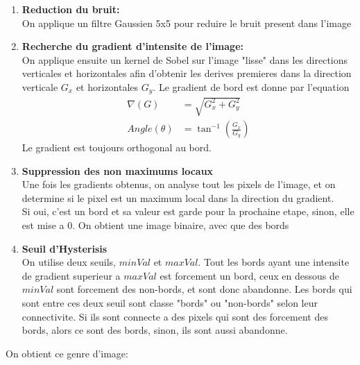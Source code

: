 \documentclass[a4paper, 12pt, titlepage, oneside]{article}
\begin{document}
	\begin{enumerate}
		\item \textbf{Reduction du bruit:}\\
			\indent On applique un filtre Gaussien 5x5 pour reduire le bruit present dans l'image
		\item \textbf{Recherche du gradient d'intensite de l'image:}\\  
		 	\indent On applique ensuite un kernel de Sobel sur l'image "lisse" dans les directions verticales et horizontales afin d'obtenir les derives premieres dans
		la direction verticale $G_x$ et horizontales $G_y$. Le gradient de bord est donne par l'equation
			\begin{align}
				\nabla (G) & = \sqrt{G_x^2 + G_y^2}\\
				Angle (\theta) & = \tan^{-1}(\frac{G_x}{G_y})
			\end{align}
		Le gradient est toujours orthogonal au bord.

		\item \textbf{Suppression des non maximums locaux}\\
			\indent Une fois les gradients obtenus, on analyse tout les pixels de l'image, et on determine si le pixel est un maximum local dans la
			direction du gradient. \\
			Si oui, c'est un bord et sa valeur est garde pour la prochaine etape, sinon, elle est mise a 0. On obtient une image binaire, avec que des bords

		\item \textbf{Seuil d'Hysterisis} \\
			\indent On utilise deux seuils, $minVal$ et $maxVal$. Tout les bords ayant une intensite de gradient superieur a $maxVal$ est forcement un
			bord, ceux en dessous de $minVal$ sont forcement des non-bords, et sont donc abandonne. Les bords qui sont entre ces deux seuil sont classe
			"bords" ou "non-bords" selon leur connectivite. Si ils sont connecte a des pixels qui sont des forcement des bords, alors ce sont des bords,
			sinon, ils sont aussi abandonne.\\
		
	\end{enumerate}
	\newpage
	On obtient ce genre d'image:\\
\end{document}

